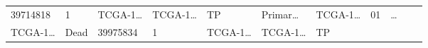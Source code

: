 \documentclass[
]{article}
\begin{document}
\begin{longtable}[]{@{}lllllllllll@{}}
\begin{minipage}[t]{0.06\columnwidth}
39714818\strut
\end{minipage} & \begin{minipage}[t]{0.07\columnwidth}\raggedright
1\strut
\end{minipage} & \begin{minipage}[t]{0.07\columnwidth}\raggedright
TCGA-1\ldots{}\strut
\end{minipage} & \begin{minipage}[t]{0.07\columnwidth}\raggedright
TCGA-1\ldots{}\strut
\end{minipage} & \begin{minipage}[t]{0.07\columnwidth}\raggedright
TP\strut
\end{minipage} & \begin{minipage}[t]{0.07\columnwidth}\raggedright
Primar\ldots{}\strut
\end{minipage} & \begin{minipage}[t]{0.09\columnwidth}\raggedright
TCGA-1\ldots{}\strut
\end{minipage} & \begin{minipage}[t]{0.10\columnwidth}\raggedright
01\strut
\end{minipage} & \begin{minipage}[t]{0.03\columnwidth}\raggedright
\ldots{}\strut
\end{minipage}\tabularnewline
\begin{minipage}[t]{0.07\columnwidth}\raggedright
TCGA-1\ldots{}\strut
\end{minipage} & \begin{minipage}[t]{0.04\columnwidth}\raggedright
Dead\strut
\end{minipage} & \begin{minipage}[t]{0.06\columnwidth}\raggedright
39975834\strut
\end{minipage} & \begin{minipage}[t]{0.07\columnwidth}\raggedright
1\strut
\end{minipage} & \begin{minipage}[t]{0.07\columnwidth}\raggedright
TCGA-1\ldots{}\strut
\end{minipage} & \begin{minipage}[t]{0.07\columnwidth}\raggedright
TCGA-1\ldots{}\strut
\end{minipage} & \begin{minipage}[t]{0.07\columnwidth}\raggedright
TP\strut
\end{minipage} & \begin{minipage}[t]{0.07\columnwidth}\raggedright

\end{minipage}
\end{longtable}
\end{document}
